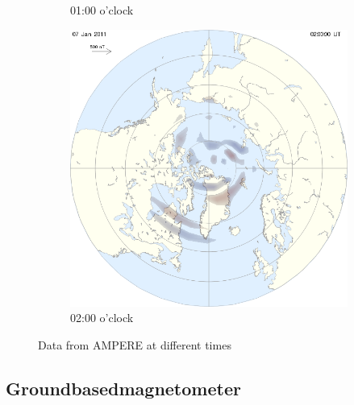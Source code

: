 \documentclass[10pt,a4paper]{article}
\begin{document}
\begin{figure}[h]
\begin{subfigure}{0.3\textwidth}
	\caption{ 01:00 o'clock \label{amp01}}
\end{subfigure}
\begin{subfigure}{0.3\textwidth}
\centering
	\includegraphics[width=\textwidth]{ampere8.png}
	\caption{ 02:00 o'clock \label{amp02}}
\end{subfigure}
\caption{Data from AMPERE at different times}
\end{figure}



\subsection{Groundbasedmagnetometer}
\end{document}

